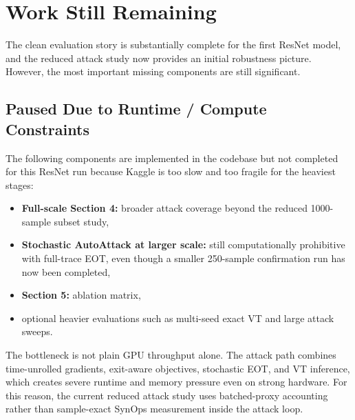 \documentclass[11pt]{article}
\begin{document}
\section{Work Still Remaining}
The clean evaluation story is substantially complete for the first ResNet model, and the reduced attack study now provides an initial robustness picture. However, the most important missing components are still significant.

\subsection{Paused Due to Runtime / Compute Constraints}
The following components are implemented in the codebase but not completed for this ResNet run because Kaggle is too slow and too fragile for the heaviest stages:
\begin{itemize}[leftmargin=1.5em]
    \item \textbf{Full-scale Section 4:} broader attack coverage beyond the reduced 1000-sample subset study,
    \item \textbf{Stochastic AutoAttack at larger scale:} still computationally prohibitive with full-trace EOT, even though a smaller 250-sample confirmation run has now been completed,
    \item \textbf{Section 5:} ablation matrix,
    \item optional heavier evaluations such as multi-seed exact VT and large attack sweeps.
\end{itemize}

The bottleneck is not plain GPU throughput alone. The attack path combines time-unrolled gradients, exit-aware objectives, stochastic EOT, and VT inference, which creates severe runtime and memory pressure even on strong hardware. For this reason, the current reduced attack study uses batched-proxy accounting rather than sample-exact SynOps measurement inside the attack loop.
\end{document}
